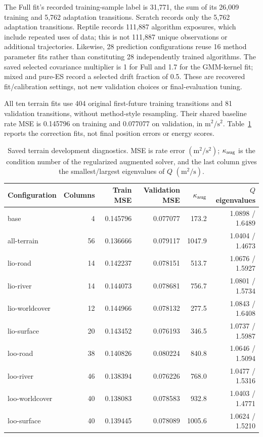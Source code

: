 \documentclass[11pt]{article}
\begin{document}
The Full fit's recorded training-sample label is 31,771, the sum of its
26,009 training and 5,762 adaptation transitions. Scratch records only the
5,762 adaptation transitions. Reptile records 111,887 algorithm exposures,
which include repeated uses of data; this is not 111,887 unique observations
or additional trajectories. Likewise, 28 prediction configurations reuse
16 method parameter fits rather than constituting 28 independently trained
algorithms. The saved selected covariance multiplier is 1 for Full and 1.7
for the GMM-kernel fit; mixed and pure-ES record a selected drift fraction
of 0.5. These are recovered fit/calibration settings, not new validation
choices or final-evaluation tuning.

All ten terrain fits use 404 original first-future training transitions and
81 validation transitions, without method-style resampling. Their shared
baseline rate MSE is 0.145796 on training and 0.077077 on validation, in
\(\mathrm{m}^2/\mathrm{s}^2\). Table~\ref{tab:terrain-fit-diagnostics}
reports the correction fits, not final position errors or energy scores.

\begin{table}[htbp]
\centering\footnotesize
\caption{Saved terrain development diagnostics. MSE is rate error
\((\mathrm{m}^2/\mathrm{s}^2)\); \(\kappa_{\rm aug}\) is the condition
number of the regularized augmented solver, and the last column gives the
smallest/largest eigenvalues of \(Q\) \((\mathrm{m}^2/\mathrm{s})\).}
\label{tab:terrain-fit-diagnostics}
\begin{tabular}{lrrrrr}
\toprule
Configuration & Columns & Train MSE & Validation MSE & \(\kappa_{\rm aug}\) & \(Q\) eigenvalues\\
\midrule
base & 4 & 0.145796 & 0.077077 & 173.2 & 1.0898 / 1.6489\\
all-terrain & 56 & 0.136666 & 0.079117 & 1047.9 & 1.0404 / 1.4673\\
lio-road & 14 & 0.142237 & 0.078151 & 513.7 & 1.0676 / 1.5927\\
lio-river & 14 & 0.144073 & 0.078681 & 756.7 & 1.0801 / 1.5734\\
lio-worldcover & 12 & 0.144966 & 0.078132 & 277.5 & 1.0843 / 1.6408\\
lio-surface & 20 & 0.143452 & 0.076193 & 346.5 & 1.0737 / 1.5987\\
loo-road & 38 & 0.140826 & 0.080224 & 840.8 & 1.0646 / 1.5094\\
loo-river & 46 & 0.138394 & 0.076226 & 768.0 & 1.0477 / 1.5316\\
loo-worldcover & 40 & 0.138083 & 0.078583 & 932.8 & 1.0403 / 1.4771\\
loo-surface & 40 & 0.139445 & 0.078089 & 1005.6 & 1.0624 / 1.5210\\
\bottomrule
\end{tabular}
\end{table}
\end{document}
